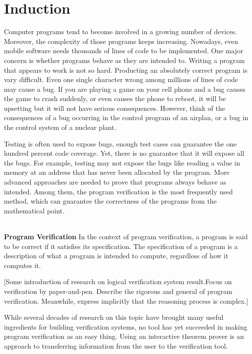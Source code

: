 \documentclass[runningheads,a4paper]{llncs}
\begin{document}
\section{Induction}
Computer programs tend to become involved in a growing number of devices. Moreover, the complexity of those programs keeps increasing. Nowadays, even mobile software needs thousands of lines of code to be implemented. One major concern is whether programs behave as they are intended to. Writing a program that appears to work is not so hard. Producting an absolutely correct program is vary difficult. Even one single character wrong among millions of lines of code may cause a bug. If you are playing a game on your cell phone and a bug causes the game to crash suddenly, or even causes the phone to reboot, it will be upsetting but it will not have serious consequences. However, think of the consequences of a bug occurring in the control program of an airplan, or a bug in the control system of a nuclear plant. 

Testing is often used to expose bugs, enough test cases can guarantee the one hundred percent code coverage. Yet, there is no guarantee that it will expose all the bugs. For example, testing may not expose the bugs like reading a value in memory at an address that has never been allocated by the program. More advanced approaches are needed to prove that programs always behave as intended. Among them, the program verification is the most frequently used method, which can guarantee the correctness of the programs from the mathematical point.

~\\
\noindent \textbf{Program Verification}\quad
In the context of program verification, a program is said to be correct if it satisfies its specification. The specification of a program is a description of what a program is intended to compute, regardless of how it computes it. 

[Some introduction of research on logical verification system result.Focus on verification by paper-and-pen. Describe the rigorous and general of program verification. Meanwhile, express implicitly that the reasoning process is complex.]

While several decades of research on this topic have brought many useful ingredients for building verification systems, no tool has yet succeeded in making program verification as an easy thing. Using an interactive theorem prover is an approach to transferring information from the user to the verification
tool.
\end{document}
